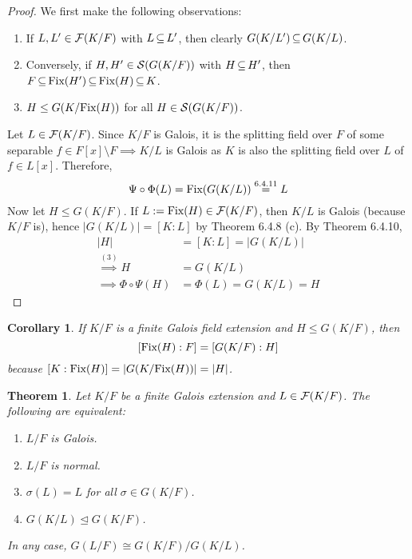 \documentclass[11pt]{book}
\newcounter{counter}
\newtheorem{theorem}[counter]{Theorem}   \newtheorem*{theorem*}{Theorem}   \newtheorem{lemma}[counter]{Lemma}   \newtheorem{corollary}[counter]{Corollary}
\theoremstyle{definition}   \newtheorem{defn}[counter]{Definition} %
\newcommand{\bs}{\setminus}   \newcommand{\A}{\mathcal{A}}   \newcommand{\sy}{\textnormal{Syl}}   \newcommand{\size}[1]{\left| #1 \right|}
\newcommand{\nsg}{\mathrel{\unlhd}}   \newcommand{\ind}{\parindent24pt}   \newcommand{\vn}{\varnothing}    \newcommand{\lar}{\longrightarrow}
\newcommand{\vs}{\vspace{8pt}}   \newcommand{\hs}{\hspace{8pt}}
\numberwithin{counter}{chapter}
\begin{document}
\begin{proof} We first make the following observations:
\begin{enumerate}
\item[(1)] If $L,L' \in \mathcal{F}(K/F)$ with $L \operatorname{\subseteq} L'$, then clearly $G(K/L') \operatorname{\subseteq} G(K/L)$.
\item[(2)] Conversely, if $H,H' \in \mathcal{S}(G(K/F))$ with $H \operatorname{\subseteq} H'$, then $F \operatorname{\subseteq} \textnormal{Fix}(H') \operatorname{\subseteq} \textnormal{Fix}(H) \operatorname{\subseteq} K$. 
\item[(3)] $H \leq G(K/\textnormal{Fix}(H))$ for all $H \in \mathcal{S}(G(K/F))$. 
\end{enumerate}

Let $L \in \mathcal{F}(K/F)$. Since $K/F$ is Galois, it is the splitting field over $F$ of some separable $f \in F[x] \bs F \implies K/L$ is Galois as $K$ is also the splitting field over $L$ of $f \in L[x]$. Therefore,
	\[\Psi \circ \Phi(L) = \textnormal{Fix}(G(K/L)) \overset{6.4.11}{=} L \]
Now let $H \leq G(K/F)$. If $L := \textnormal{Fix}(H) \in \mathcal{F}(K/F)$, then $K/L$ is Galois (because $K/F$ is), hence $|G(K/L)| = [K : L]$ by Theorem 6.4.8 (c). By Theorem 6.4.10,
\begin{align*}
|H| &= [K : L] = |G(K/L)| \\
\overset{(3)}{\implies} H &= G(K/L) \\
\implies \Phi \circ \Psi(H) &= \Phi(L) = G(K/L) = H
\end{align*}
\end{proof}

\vs

\begin{corollary}
If $K/F$ is a finite Galois field extension and $H \leq G(K/F)$, then 
	\[[\textnormal{Fix}(H) : F] = [G(K/F) : H] \]
because $[K : \textnormal{Fix}(H)] = |G(K/\textnormal{Fix}(H))| = |H|$. 
\end{corollary}

\vs

\begin{theorem}
Let $K/F$ be a finite Galois extension and $L \in \mathcal{F}(K/F)$. The following are equivalent:
\begin{enumerate}
\item[(i)] $L/F$ is Galois.
\item[(ii)] $L/F$ is normal.
\item[(iii)] $\sigma(L) = L$ for all $\sigma \in G(K/F)$. 
\item[(iv)] $G(K/L) \nsg G(K/F)$. 
\end{enumerate}
In any case, $G(L/F) \cong G(K/F) / G(K/L)$. 
\end{theorem}
\end{document}
